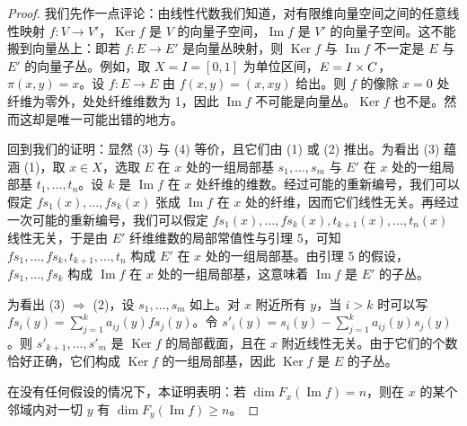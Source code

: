 \begin{proof} 我们先作一点评论：由线性代数我们知道，对有限维向量空间之间的任意线性映射 $f : V \to V'$，$\operatorname{Ker}f$ 是 $V$ 的向量子空间，$\operatorname{Im}f$ 是 $V'$ 的向量子空间。这不能搬到向量丛上：即若 $f : E \to E'$ 是向量丛映射，则 $\operatorname{Ker}f$ 与 $\operatorname{Im}f$ 不一定是 $E$ 与 $E'$ 的向量子丛。例如，取 $X = I = [0, 1]$ 为单位区间，$E = I \times C$，$\pi(x, y) = x$。设 $f : E \to E$ 由 $f(x, y) = (x, xy)$ 给出。则 $f$ 的像除 $x = 0$ 处纤维为零外，处处纤维维数为 1，因此 $\operatorname{Im}f$ 不可能是向量丛。$\operatorname{Ker}f$ 也不是。然而这却是唯一可能出错的地方。

回到我们的证明：显然 (3) 与 (4) 等价，且它们由 (1) 或 (2) 推出。为看出 (3) 蕴涵 (1)，取 $x \in X$，选取 $E$ 在 $x$ 处的一组局部基 $s_1, \dots, s_m$ 与 $E'$ 在 $x$ 处的一组局部基 $t_1, \dots, t_n$。设 $k$ 是 $\operatorname{Im}f$ 在 $x$ 处纤维的维数。经过可能的重新编号，我们可以假定 $fs_1(x), \dots, fs_k(x)$ 张成 $\operatorname{Im}f$ 在 $x$ 处的纤维，因而它们线性无关。再经过一次可能的重新编号，我们可以假定 $fs_1(x), \dots, fs_k(x), t_{k+1}(x), \dots, t_n(x)$ 线性无关，于是由 $E'$ 纤维维数的局部常值性与引理 5，可知 $fs_1, \dots, fs_k, t_{k+1}, \dots, t_n$ 构成 $E'$ 在 $x$ 处的一组局部基。由引理 5 的假设，$fs_1, \dots, fs_k$ 构成 $\operatorname{Im}f$ 在 $x$ 处的一组局部基，这意味着 $\operatorname{Im}f$ 是 $E'$ 的子丛。

为看出 (3) $\Rightarrow$ (2)，设 $s_1, \dots, s_m$ 如上。对 $x$ 附近所有 $y$，当 $i > k$ 时可以写 $fs_i(y) = \sum_{j=1}^{k} a_{ij}(y)fs_j(y)$。令 $s'_i(y) = s_i(y) - \sum_{j=1}^{k} a_{ij}(y)s_j(y)$。则 $s'_{k+1}, \dots, s'_m$ 是 $\operatorname{Ker}f$ 的局部截面，且在 $x$ 附近线性无关。由于它们的个数恰好正确，它们构成 $\operatorname{Ker}f$ 的一组局部基，因此 $\operatorname{Ker}f$ 是 $E$ 的子丛。

 在没有任何假设的情况下，本证明表明：若 $\operatorname{dim}F_x(\operatorname{Im}f) = n$，则在 $x$ 的某个邻域内对一切 $y$ 有 $\operatorname{dim}F_y(\operatorname{Im}f) \ge n$。\end{proof}

